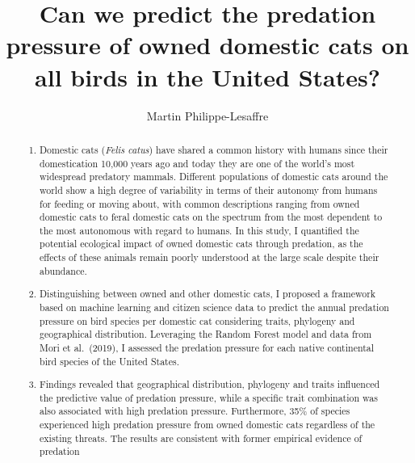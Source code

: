 \documentclass[
  super,
  review,
  3p]{elsarticle}
\providecommand{\tightlist}{%
  \setlength{\itemsep}{0pt}\setlength{\parskip}{0pt}}\usepackage{longtable,booktabs,array}
\begin{document}
\begin{frontmatter}
\title{Can we predict the predation pressure of owned domestic cats on
all birds in the United States?}
\author[1,2]{Martin Philippe-Lesaffre%
%
}



        
\begin{abstract}
\begin{enumerate}
\def\labelenumi{\arabic{enumi}.}
\tightlist
\item
  Domestic cats (\emph{Felis catus}) have shared a common history with
  humans since their domestication 10,000 years ago and today they are
  one of the world's most widespread predatory mammals. Different
  populations of domestic cats around the world show a high degree of
  variability in terms of their autonomy from humans for feeding or
  moving about, with common descriptions ranging from owned domestic
  cats to feral domestic cats on the spectrum from the most dependent to
  the most autonomous with regard to humans. In this study, I quantified
  the potential ecological impact of owned domestic cats through
  predation, as the effects of these animals remain poorly understood at
  the large scale despite their abundance.
\item
  Distinguishing between owned and other domestic cats, I proposed a
  framework based on machine learning and citizen science data to
  predict the annual predation pressure on bird species per domestic cat
  considering traits, phylogeny and geographical distribution.
  Leveraging the Random Forest model and data from Mori et al.~(2019), I
  assessed the predation pressure for each native continental bird
  species of the United States.
\item
  Findings revealed that geographical distribution, phylogeny and traits
  influenced the predictive value of predation pressure, while a
  specific trait combination was also associated with high predation
  pressure. Furthermore, 35\% of species experienced high predation
  pressure from owned domestic cats regardless of the existing threats.
  The results are consistent with former empirical evidence of predation

\end{enumerate}
\end{abstract}
\end{frontmatter}
\end{document}
